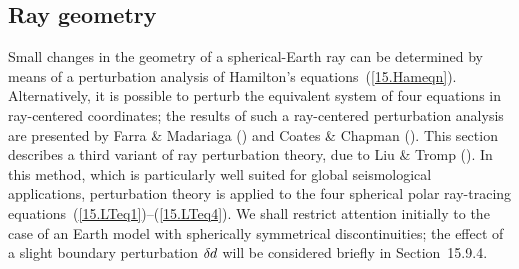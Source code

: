 \renewcommand{\thesubsection}{$\!\!\!\raise1.3ex\hbox{$\star$}\!\!$
\arabic{chapter}.\arabic{section}.\arabic{subsection}}
\subsection{Ray geometry}
%
\renewcommand{\thesubsection}{\arabic{chapter}.\arabic{section}.\arabic{subsection}}

Small changes in the geometry of a spherical-Earth ray
can be determined by means of a perturbation analysis
of Hamilton's equations~(\ref{15.Hameqn}).  Alternatively,
it is possible to perturb the equivalent system of four
equations in ray-centered coordinates; the results of
such a ray-centered perturbation
analysis are presented by Farra \& Madariaga
(\citeyear{farra&madariaga87}) and Coates \& Chapman
(\citeyear{coates&chapman90}).  This section
describes a third variant of ray perturbation theory,
due to Liu \& Tromp (\citeyear{liu&tromp96}).  In this
method, which is particularly well suited for global
seismological applications, perturbation theory
is applied to the four spherical polar ray-tracing
equations~(\ref{15.LTeq1})--(\ref{15.LTeq4}).
We shall restrict attention initially to the case
of an Earth model with spherically symmetrical
discontinuities; the effect of a slight
boundary perturbation $\delta\hspace{-0.1 mm}d$
will be considered briefly in Section~15.9.4.

